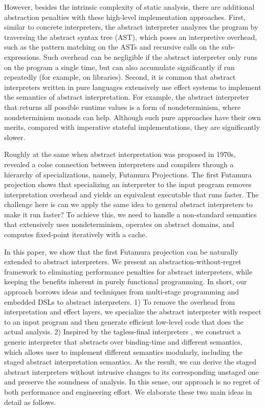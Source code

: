 However, besides the intrinsic complexity of static analysis, there
are additional abstraction penalties with these high-level
implementation approaches. First, similar to concrete interpreters,
the abstract interpreter analyzes the program by traversing the
abstract syntax tree (AST), which poses an interpretive overhead, such
as the pattern matching on the ASTs and recursive calls on the
sub-expressions.
Such overhead can be negligible if the abstract interpreter only runs
on the program a single time, but can also accumulate significantly if
run repeatedly (for example, on libraries).  Second, it is common that
abstract interpreters written in pure languages extensively use effect
systems to implement the semantics of abstract interpretation. For
example, the abstract interpreter that returns all possible runtime
values is a form of nondeterminism, where nondeterminism monads can
help.  Although such pure approaches have their own merits, compared
with imperative stateful implementations, they are significantly
slower.

Roughly at the same when abstract interpretation was proposed in
1970s, \citet{futamura1971partial, Futamura1999} revealed a colse
connection between interpreters and compilers through a hierarchy of
specializations, namely, Futamura Projections. The first Futamura
projection shows that specializing an interpreter to the input program
removes interpretation overhead and yields an equivalent executable
that runs faster.  The challenge here is can we apply the same idea to
general abstract interpreters to make it run faster?
To achieve this, we need to handle a non-standard semantics that
extensively uses nondeterminism, operates on abstract domains, and
computes fixed-point iteratively with a cache.

In this paper, we show that the first Futamura projection can be
naturally extended to abstract interpreters. We present an
abstraction-without-regret framework to eliminating performance
penalties for abstract interpreters, while keeping the benefits
inherent in purely functional programming. In short, our approach
borrows ideas and techniques from multi-stage programming and embedded
DSLs to abstract interpreters.  1) To remove the overhead from
interpretation and effect layers, we specialize the abstract
interpreter with respect to an input program and then generate
efficient low-level code that does the actual analysis.  2) Inspired
by the tagless-final interpreters
\cite{DBLP:journals/jfp/CaretteKS09}, we construct a generic
interpreter that abstracts over binding-time and different semantics,
which allows user to implement different semantics modularly,
including the staged abstract interpretation semantics. As the result,
we can derive the staged abstract interpreters without intrusive
changes to its corresponding unstaged one and preserve the soundness
of analysis. In this sense, our approach is no regret of both
performance and engineering effort. We elaborate these two main ideas
in detail as follows.

